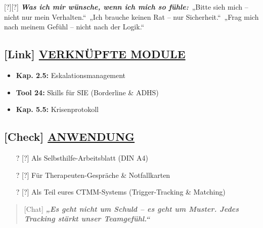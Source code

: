 [?][?] \emph{\textbf{Was ich mir wünsche, wenn ich mich so fühle:}}\
„Bitte sieh mich -- nicht nur mein Verhalten.``\
„Ich brauche keinen Rat -- nur Sicherheit.``\
„Frag mich nach meinem Gefühl -- nicht nach der Logik.``

\hypertarget{verknuxfcpfte-module}{%
\subsection{\texorpdfstring{[Link] \textbf{\ul{VERKNÜPFTE MODULE}}}{[Link] VERKNÜPFTE MODULE}}\label{verknuxfcpfte-module}}

\begin{itemize}
\tightlist
\item
  \textbf{Kap. 2.5:} Eskalationsmanagement
\item
  \textbf{Tool 24:} Skills für SIE (Borderline \& ADHS)
\item
  \textbf{Kap. 5.5:} Krisenprotokoll
\end{itemize}

\hypertarget{anwendung}{%
\subsection{\texorpdfstring{[Check] \textbf{\ul{ANWENDUNG}}}{[Check] ANWENDUNG}}\label{anwendung}}

\begin{itemize}
\tightlist
\item
  [?][?] Als Selbsthilfe-Arbeitsblatt (DIN A4)
\item
  [?][?] Für Therapeuten-Gespräche \& Notfallkarten
\item
  [?][?] Als Teil eures CTMM-Systems (Trigger-Tracking \& Matching)
\end{itemize}

\begin{quote}
[Chat] \emph{\textbf{„Es geht nicht um Schuld -- es geht um Muster. Jedes Tracking stärkt unser Teamgefühl.``}}
\end{quote}
